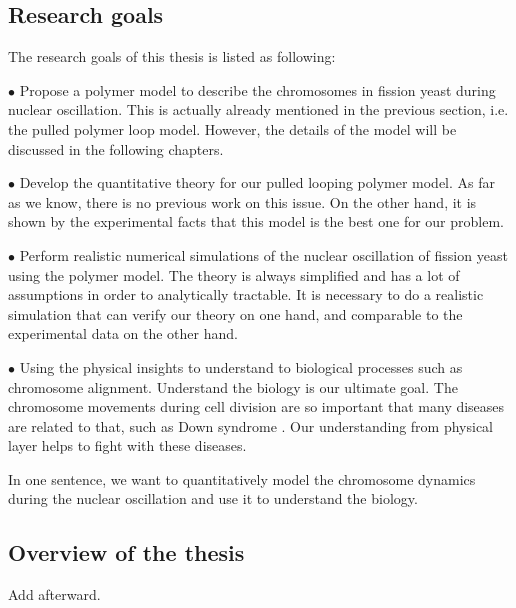 \subsection{Research goals}
\label{sub:research_goal}

The research goals of this thesis is listed as following:

$\bullet$ Propose a polymer model to describe the chromosomes in fission yeast during nuclear oscillation. This is actually already mentioned in the previous section, i.e. the pulled polymer loop model. However, the details of the model will be discussed in the following chapters.

$\bullet$ Develop the quantitative theory for our pulled looping polymer model. As far as we know, there is no previous work on this issue. On the other hand, it is shown by the experimental facts that this model is the best one for our problem. 

$\bullet$ Perform realistic numerical simulations of the nuclear oscillation of fission yeast using the polymer model. The theory is always simplified and has a lot of assumptions in order to analytically tractable. It is necessary to do a realistic simulation that can verify our theory on one hand, and comparable to the experimental data on the other hand.

$\bullet$ Using the physical insights to understand to biological processes such as chromosome alignment. Understand the biology is our ultimate goal. The chromosome movements during cell division are so important that many diseases are related to that, such as Down syndrome \cite{Patterson2009}. Our understanding from physical layer helps to fight with these diseases.

In one sentence, we want to quantitatively model the chromosome dynamics during the nuclear oscillation and use it to understand the biology. 

\subsection{Overview of the thesis}
\label{sub:organisation_of_the_thesis}

Add afterward.



